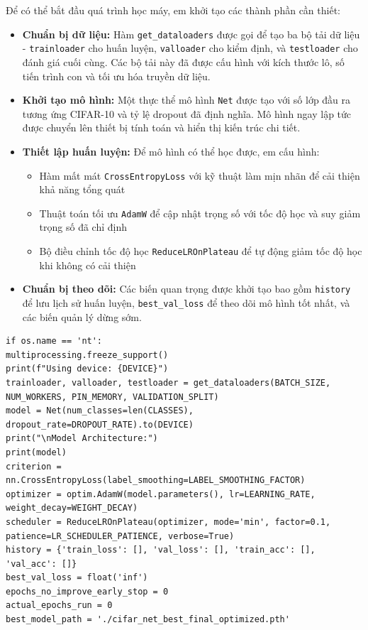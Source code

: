 \documentclass[12pt, a4paper, openany]{report}
\begin{document}
Để có thể bắt đầu quá trình học máy, em khởi tạo các thành phần cần thiết:
\begin{itemize}
    \item \textbf{Chuẩn bị dữ liệu:} Hàm \texttt{get\_dataloaders} được gọi để tạo ba bộ tải dữ liệu - \texttt{trainloader} cho huấn luyện, \texttt{valloader} cho kiểm định, và \texttt{testloader} cho đánh giá cuối cùng. Các bộ tải này đã được cấu hình với kích thước lô, số tiến trình con và tối ưu hóa truyền dữ liệu.
    \item \textbf{Khởi tạo mô hình:} Một thực thể mô hình \texttt{Net} được tạo với số lớp đầu ra tương ứng CIFAR-10 và tỷ lệ dropout đã định nghĩa. Mô hình ngay lập tức được chuyển lên thiết bị tính toán và hiển thị kiến trúc chi tiết.
    \item \textbf{Thiết lập huấn luyện:} Để mô hình có thể học được, em cấu hình:
    \begin{itemize}
        \item Hàm mất mát \texttt{CrossEntropyLoss} với kỹ thuật làm mịn nhãn để cải thiện khả năng tổng quát
        \item Thuật toán tối ưu \texttt{AdamW} để cập nhật trọng số với tốc độ học và suy giảm trọng số đã chỉ định
        \item Bộ điều chỉnh tốc độ học \texttt{ReduceLROnPlateau} để tự động giảm tốc độ học khi không có cải thiện
    \end{itemize}
    \item \textbf{Chuẩn bị theo dõi:} Các biến quan trọng được khởi tạo bao gồm \texttt{history} để lưu lịch sử huấn luyện, \texttt{best\_val\_loss} để theo dõi mô hình tốt nhất, và các biến quản lý dừng sớm.
\end{itemize}

\begin{verbatim}
if os.name == 'nt': 
multiprocessing.freeze_support()
print(f"Using device: {DEVICE}")
trainloader, valloader, testloader = get_dataloaders(BATCH_SIZE, NUM_WORKERS, PIN_MEMORY, VALIDATION_SPLIT)
model = Net(num_classes=len(CLASSES), dropout_rate=DROPOUT_RATE).to(DEVICE)
print("\nModel Architecture:")
print(model)
criterion = nn.CrossEntropyLoss(label_smoothing=LABEL_SMOOTHING_FACTOR)
optimizer = optim.AdamW(model.parameters(), lr=LEARNING_RATE, weight_decay=WEIGHT_DECAY)
scheduler = ReduceLROnPlateau(optimizer, mode='min', factor=0.1,
patience=LR_SCHEDULER_PATIENCE, verbose=True)
history = {'train_loss': [], 'val_loss': [], 'train_acc': [], 'val_acc': []}
best_val_loss = float('inf')
epochs_no_improve_early_stop = 0
actual_epochs_run = 0
best_model_path = './cifar_net_best_final_optimized.pth' 
\end{verbatim}
\end{document}

